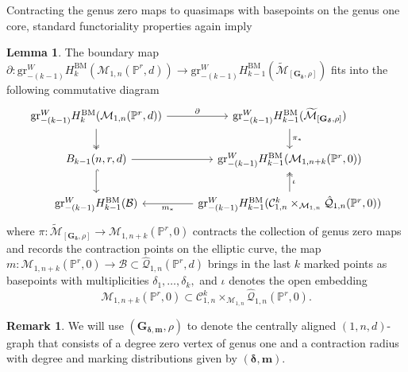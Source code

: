 \documentclass[12pt,reqno]{amsart}
\theoremstyle{definition}
\theoremstyle{definition}
\theoremstyle{definition}
\theoremstyle{definition}
\newtheorem{lemma}[theorem]{Lemma}
\newtheorem{remark}[theorem]{Remark}
\newcommand{\PP}{\mathbb{P}}
\newcommand{\Mtil}{\widetilde{\mathcal{M}}}
\newcommand{\gr}{\mathrm{gr}}
\begin{document}
Contracting the genus zero maps to quasimaps with basepoints on the genus one core, standard functoriality properties again imply
\begin{lemma}\label{lem:cobradmer}
  The boundary map $\partial: \gr^W_{-(k-1)}H_k^{\mathrm{BM}}(\mathcal{M}_{1,n}(\PP^r,d))\to \mathrm{gr}^W_{-(k-1)}H_{k-1}^{\mathrm{BM}}(\Mtil_{[\mathbf{G}_{\boldsymbol{\delta}},\rho]})$ fits into the following commutative diagram \[\begin{tikzcd}
	{\gr^W_{-(k-1)}H_k^{\mathrm{BM}}(\mathcal{M}_{1,n}(\PP^r,d))} & {\gr^W_{-(k-1)}H_{k-1}^{\mathrm{BM}}(\Mtil_{[\mathbf{G}_{\boldsymbol{\delta}},\rho]})} \\
	{B_{k-1}(n,r,d)} & {\mathrm{gr}^W_{-(k-1)}H_{k-1}^{\mathrm{BM}}({\mathcal{M}}_{1,n+k}(\PP^r,0))} \\
	{\gr^W_{-(k-1)}H_{k-1}^{\mathrm{BM}}(\mathcal{B})} & {\mathrm{gr}^W_{-(k-1)}H_{k-1}^{\mathrm{BM}}({\mathcal{C}}_{1,n}^k\times_{\mathcal{M}_{1,n}}\hat{\mathcal{Q}}_{1,n}(\PP^r,0))}
	\arrow["\partial", from=1-1, to=1-2]
	\arrow[two heads, from=1-1, to=2-1]
	\arrow["{\pi_*}", from=1-2, to=2-2]
	\arrow[hook, from=2-1, to=3-1]
	\arrow[from=2-1, to=2-2]
	\arrow["\iota"', two heads, from=3-2, to=2-2]
	\arrow["{m_*}", from=3-2, to=3-1]
\end{tikzcd}\]where $\pi:\Mtil_{[\mathbf{G}_{\boldsymbol{\delta}},\rho]}\to \mathcal{M}_{1,n+k}(\PP^r,0)$ contracts the collection of genus zero maps and records the contraction points on the elliptic curve, the map $m: \mathcal{M}_{1,n+k}(\PP^r,0)\to \mathcal{B}\subset \hat{\mathcal{Q}}_{1,n}(\PP^r,d)$ brings in the last $k$ marked points as basepoints with multiplicities $\delta_1,\dots,\delta_k,$ and $\iota$ denotes the open embedding $$\mathcal{M}_{1,n+k}(\PP^r,0)\subset \mathcal{C}_{1,n}^k\times_{\mathcal{M}_{1,n}}\hat{\mathcal{Q}}_{1,n}(\PP^r,0).$$
\end{lemma}

\begin{remark}
  We will use $(\mathbf{G}_{\boldsymbol{\delta},\boldsymbol{m}},\rho)$ to denote the centrally aligned $(1,n,d)$-graph that consists of a degree zero vertex of genus one and a contraction radius with degree and marking distributions given by $(\boldsymbol{\delta},\boldsymbol{m}).$
\end{remark}
\end{document}
